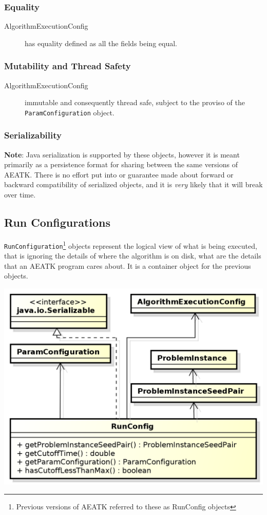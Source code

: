 \documentclass[11pt,letterpaper,oneside]{article}
\begin{document}
\subsubsection{Equality}
\begin{description}
\item[AlgorithmExecutionConfig] has equality defined as all the fields being equal.
\end{description}

\subsubsection{Mutability and Thread Safety}
\begin{description}
\item[AlgorithmExecutionConfig] immutable and consequently thread safe, subject to the proviso of the \texttt{ParamConfiguration} object.
\end{description}

\subsubsection{Serializability}

\textbf{Note}: Java serialization is supported by these objects, however it is meant primarily as a persistence format for sharing between the same versions of AEATK. There is no effort put into or guarantee made about forward or backward compatibility of serialized objects, and it is \emph{very} likely that it will break over time.

\subsection{Run Configurations}

\texttt{RunConfiguration}\footnote{Previous versions of AEATK referred to these as RunConfig objects} objects represent the logical view of what is being executed, that is ignoring the details of where the algorithm is on disk, what are the details that an AEATK program cares about. It is a container object for the previous objects.

\begin{center}
\includegraphics[scale=0.75]{img/UML/RunConfig_2.png}
\end{center}
\end{document}
